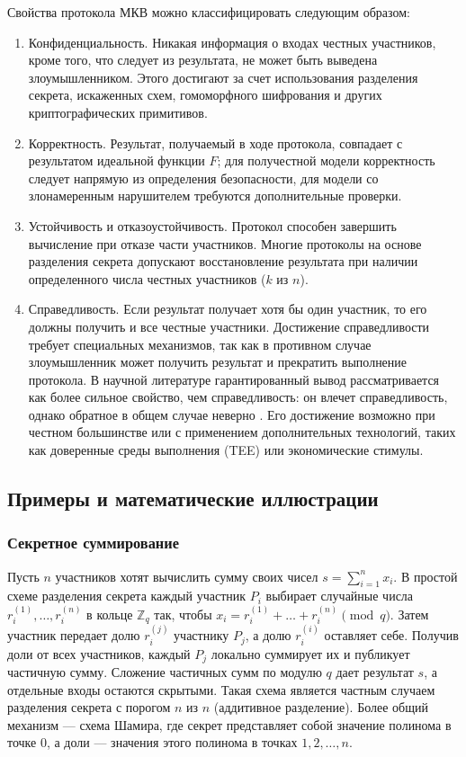 Свойства протокола МКВ можно классифицировать следующим образом:

\begin{enumerate}
\item Конфиденциальность. Никакая информация о входах честных участников, кроме того, что следует из результата, не может быть выведена злоумышленником. Этого достигают за счет использования разделения секрета, искаженных схем, гомоморфного шифрования и других криптографических примитивов.

\item Корректность. Результат, получаемый в ходе протокола, совпадает с результатом идеальной функции \(F\); для получестной модели корректность следует напрямую из определения безопасности, для модели со злонамеренным нарушителем требуются дополнительные проверки.

\item Устойчивость и отказоустойчивость. Протокол способен завершить вычисление при отказе части участников. Многие протоколы на основе разделения секрета допускают восстановление результата при наличии определенного числа честных участников (\(k\) из \(n\)).

\item Справедливость. Если результат получает хотя бы один участник, то его должны получить и все честные участники. Достижение справедливости требует специальных механизмов, так как в противном случае злоумышленник может получить результат и прекратить выполнение протокола. В научной литературе гарантированный вывод рассматривается как более сильное свойство, чем справедливость: он влечет справедливость, однако обратное в общем случае неверно \cite{24}. Его достижение возможно при честном большинстве или с применением дополнительных технологий, таких как доверенные среды выполнения (TEE) или экономические стимулы.
\end{enumerate}

\subsection{Примеры и математические иллюстрации}
\subsubsection{Секретное суммирование}
Пусть \(n\) участников хотят вычислить сумму своих чисел \(s=\sum_{i=1}^{n}x_{i}\). В простой схеме разделения секрета каждый участник \(P_{i}\) выбирает случайные числа \(r_{i}^{(1)},\ldots,r_{i}^{(n)}\) в кольце \(\mathbb{Z}_{q}\) так, чтобы \(x_{i}=r_{i}^{(1)}+\ldots+r_{i}^{(n)} \pmod q\). Затем участник передает долю \(r_{i}^{(j)}\) участнику \(P_{j}\), а долю \(r_{i}^{(i)}\) оставляет себе. Получив доли от всех участников, каждый \(P_{j}\) локально суммирует их и публикует частичную сумму. Сложение частичных сумм по модулю \(q\) дает результат \(s\), а отдельные входы остаются скрытыми. Такая схема является частным случаем разделения секрета с порогом \(n\) из \(n\) (аддитивное разделение). Более общий механизм --- схема Шамира, где секрет представляет собой значение полинома в точке 0, а доли --- значения этого полинома в точках \(1,2,\ldots,n\).\newpage

